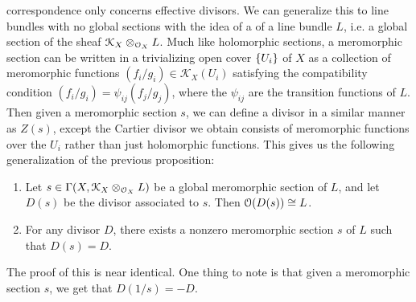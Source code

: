 correspondence only concerns effective divisors. We can generalize this to line
bundles with no global sections with the idea of a  of a line
bundle $L$, i.e. a global section of the sheaf $\mathcal{K}_X \otimes_{\mathcal{O}_X} L$. Much
like holomorphic sections, a meromorphic section can be written in a trivializing open
cover $\left\lbrace U_i \right\rbrace$ of $X$ as a collection of meromorphic functions
$(f_i/g_i) \in \mathcal{K}_X(U_i)$ satisfying the compatibility condition
$(f_i/g_i) = \psi_{ij}(f_j/g_j)$, where the $\psi_{ij}$ are the transition functions
of $L$. Then given a meromorphic section $s$, we can define a divisor in a similar
manner as $Z(s)$, except the Cartier divisor we obtain consists of meromorphic
functions over the $U_i$ rather than just holomorphic functions. This gives us the
following generalization of the previous proposition:
%
\begin{prop} \enumbreak
\begin{enumerate}
  \item Let $s \in \Gamma(X,\mathcal{K}_X\otimes_{\mathcal{O}_X}L)$ be a global meromorphic
  section of $L$, and let $D(s)$ be the divisor associated to $s$. Then
  $\mathcal{O}(D(s)) \cong L$.
  \item For any divisor $D$, there exists a nonzero meromorphic section $s$
  of $L$ such that $D(s) = D$.
\end{enumerate}
\end{prop}
%
The proof of this is near identical. One thing to note is that given
a meromorphic section $s$, we get that $D(1/s) = -D$.\\

